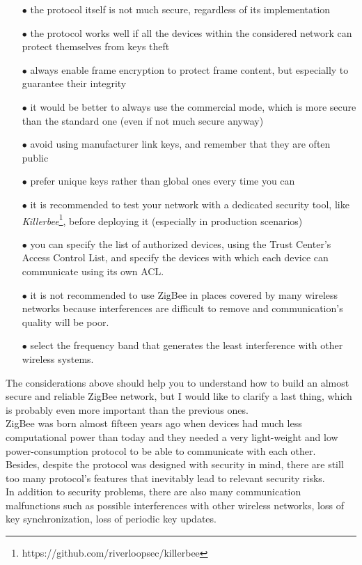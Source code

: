 \documentclass[12pt]{report}
\begin{document}
\begin{itemize}
\setlength{\itemindent}{+4mm}
\item[$\bullet$] the protocol itself is not much secure, regardless of its implementation
\item[$\bullet$] the protocol works well if all the devices within the considered network can protect themselves from keys theft
\item[$\bullet$] always enable frame encryption to protect frame content, but especially to guarantee their integrity
\item[$\bullet$] it would be better to always use the commercial mode, which is more secure than the standard one (even if not much secure anyway)
\item[$\bullet$] avoid using manufacturer link keys, and remember that they are often public
\item[$\bullet$] prefer unique keys rather than global ones every time you can
\item[$\bullet$] it is recommended to test your network with a dedicated security tool, like \emph{Killerbee}\footnote{https://github.com/riverloopsec/killerbee}, before deploying it (especially in production scenarios)
\item[$\bullet$] you can specify the list of authorized devices, using the Trust Center's Access Control List, and specify the devices with which each device can communicate using its own ACL.
\item[$\bullet$] it is not recommended to use ZigBee in places covered by many wireless networks because interferences are difficult to remove and communication's quality will be poor.
\item[$\bullet$] select the frequency band that generates the least interference with other wireless systems.\\
\end{itemize}

The considerations above should help you to understand how to build an almost secure and reliable ZigBee network, but I would like to clarify a last thing, which is probably even more important than the previous ones.\\
ZigBee was born almost fifteen years ago when devices had much less computational power than today and they needed a very light-weight and low power-consumption protocol to be able to communicate with each other.\\Besides, despite the protocol was designed with security in mind, there are still too many protocol's features that inevitably lead to relevant security risks.\\
In addition to security problems, there are also many communication malfunctions such as possible interferences with other wireless networks, loss of key synchronization, loss of periodic key updates.\\
\end{document}
